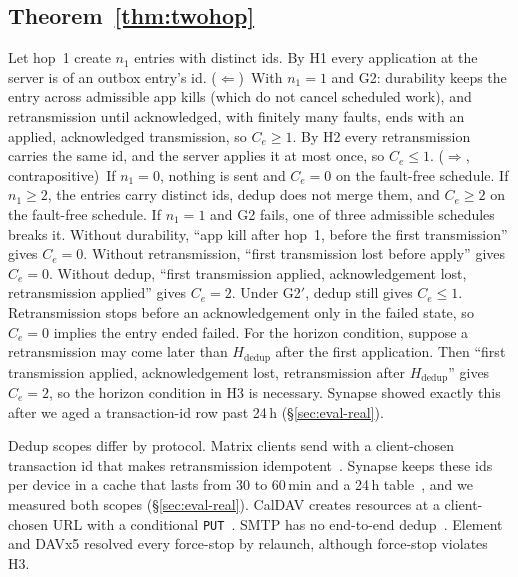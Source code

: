 \subsection{Theorem~\ref{thm:twohop}}
Let hop~1 create $n_1$ entries with distinct ids. By H1 every application at the server is of an outbox entry's id.
($\Leftarrow$)~With $n_1{=}1$ and G2: durability keeps the entry across admissible app kills (which do not cancel scheduled work), and retransmission until acknowledged, with finitely many
faults, ends with an applied, acknowledged transmission, so $C_e\ge1$. By H2 every retransmission carries the same id, and the server applies it at most once, so $C_e\le1$.
($\Rightarrow$, contrapositive)~If $n_1{=}0$, nothing is sent and $C_e=0$ on the fault-free schedule. If $n_1\ge2$, the entries carry distinct ids, dedup does not merge them, and
$C_e\ge2$ on the fault-free schedule. If $n_1{=}1$ and G2 fails, one of three admissible schedules breaks it. Without durability, ``app kill after hop~1, before the first transmission'' gives $C_e=0$.
Without retransmission, ``first transmission lost before apply'' gives $C_e=0$. Without dedup, ``first transmission applied, acknowledgement lost, retransmission applied'' gives $C_e=2$.
Under G2$'$, dedup still gives $C_e\le1$. Retransmission stops before an acknowledgement only in the failed state, so $C_e=0$ implies the entry ended failed.
For the horizon condition, suppose a retransmission may come later than $H_{\mathrm{dedup}}$ after the first application. Then ``first transmission applied, acknowledgement lost,
retransmission after $H_{\mathrm{dedup}}$'' gives $C_e=2$, so the horizon condition in H3 is necessary. Synapse showed exactly this after we aged a transaction-id row past 24\,h (\S\ref{sec:eval-real}).

Dedup scopes differ by protocol. Matrix clients send with a client-chosen transaction id that makes retransmission idempotent~\cite{matrix_spec}. Synapse keeps
these ids per device in a cache that lasts from 30 to 60\,min and a 24\,h table~\cite{synapse_txn,matrix_spec}, and we measured both scopes (\S\ref{sec:eval-real}). CalDAV creates resources
at a client-chosen URL with a conditional \texttt{PUT}~\cite{rfc4791,rfc9110}. SMTP has no end-to-end dedup~\cite{rfc5321}. Element and DAVx5 resolved every force-stop
by relaunch, although force-stop violates H3.

